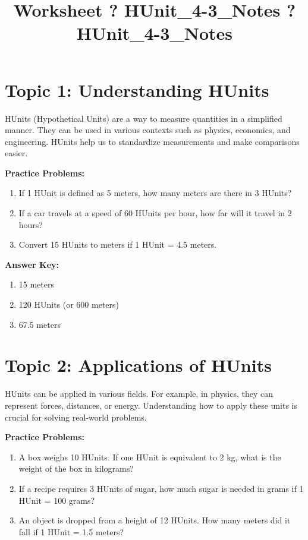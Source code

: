 \documentclass{article}
\title{Worksheet ? HUnit\_4-3\_Notes ? HUnit\_4-3\_Notes}
\author{}
\date{}
\begin{document}
\maketitle

\section*{Topic 1: Understanding HUnits}
HUnits (Hypothetical Units) are a way to measure quantities in a simplified manner. They can be used in various contexts such as physics, economics, and engineering. HUnits help us to standardize measurements and make comparisons easier.

\textbf{Practice Problems:}
\begin{enumerate}[label=\arabic*.]
    \item If 1 HUnit is defined as 5 meters, how many meters are there in 3 HUnits?
    \item If a car travels at a speed of 60 HUnits per hour, how far will it travel in 2 hours?
    \item Convert 15 HUnits to meters if 1 HUnit = 4.5 meters.
\end{enumerate}

\textbf{Answer Key:}
\begin{enumerate}[label=\arabic*.]
    \item 15 meters
    \item 120 HUnits (or 600 meters)
    \item 67.5 meters
\end{enumerate}

\section*{Topic 2: Applications of HUnits}
HUnits can be applied in various fields. For example, in physics, they can represent forces, distances, or energy. Understanding how to apply these units is crucial for solving real-world problems.

\textbf{Practice Problems:}
\begin{enumerate}[label=\arabic*.]
    \item A box weighs 10 HUnits. If one HUnit is equivalent to 2 kg, what is the weight of the box in kilograms?
    \item If a recipe requires 3 HUnits of sugar, how much sugar is needed in grams if 1 HUnit = 100 grams?
    \item An object is dropped from a height of 12 HUnits. How many meters did it fall if 1 HUnit = 1.5 meters?
\end{enumerate}
\end{document}
